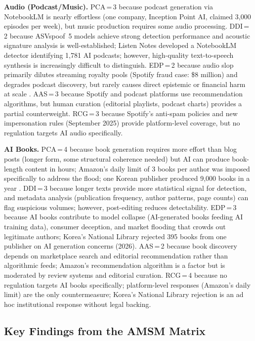 \documentclass[12pt,a4paper]{article}
\begin{document}
\textbf{Audio (Podcast/Music).} PCA\,=\,3 because podcast generation via NotebookLM is nearly effortless (one company, Inception Point AI, claimed 3,000 episodes per week), but music production requires some audio processing. DDI\,=\,2 because ASVspoof~5 models achieve strong detection performance and acoustic signature analysis is well-established; Listen Notes developed a NotebookLM detector identifying 1,781 AI podcasts; however, high-quality text-to-speech synthesis is increasingly difficult to distinguish. EDP\,=\,2 because audio slop primarily dilutes streaming royalty pools (Spotify fraud case: \$8 million) and degrades podcast discovery, but rarely causes direct epistemic or financial harm at scale \parencite{Time2026}. AAS\,=\,3 because Spotify and podcast platforms use recommendation algorithms, but human curation (editorial playlists, podcast charts) provides a partial counterweight. RCG\,=\,3 because Spotify's anti-spam policies and new impersonation rules (September 2025) provide platform-level coverage, but no regulation targets AI audio specifically.

\textbf{AI Books.} PCA\,=\,4 because book generation requires more effort than blog posts (longer form, some structural coherence needed) but AI can produce book-length content in hours; Amazon's daily limit of 3 books per author was imposed specifically to address the flood; one Korean publisher produced 9,000 books in a year \parencite{KoreaTimes2025}. DDI\,=\,3 because longer texts provide more statistical signal for detection, and metadata analysis (publication frequency, author patterns, page counts) can flag suspicious volumes; however, post-editing reduces detectability. EDP\,=\,3 because AI books contribute to model collapse (AI-generated books feeding AI training data), consumer deception, and market flooding that crowds out legitimate authors; Korea's National Library rejected 395 books from one publisher on AI generation concerns (2026). AAS\,=\,2 because book discovery depends on marketplace search and editorial recommendation rather than algorithmic feeds; Amazon's recommendation algorithm is a factor but is moderated by review systems and editorial curation. RCG\,=\,4 because no regulation targets AI books specifically; platform-level responses (Amazon's daily limit) are the only countermeasure; Korea's National Library rejection is an ad hoc institutional response without legal backing.

\subsection{Key Findings from the AMSM Matrix}
\end{document}
